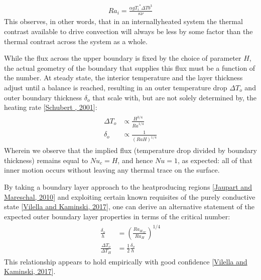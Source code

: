 \documentclass[letterpaper,10pt,english]{jupyterBook}
\begin{document}
\begin{equation*}
\begin{split} {Ra}_i = \frac{\alpha g {T_i}^{*} \Delta T b^3}{\kappa \nu} \end{split}
\end{equation*}
\sphinxAtStartPar
This observes, in other words, that \sphinxhyphen{} in an internally\sphinxhyphen{}heated system \sphinxhyphen{} the thermal contrast available to drive convection will always be less by some factor than the thermal contrast across the system as a whole.

\sphinxAtStartPar
While the flux across the upper boundary is fixed by the choice of parameter \(H\), the actual geometry of the boundary that supplies this flux must be a function of the  number. At steady state, the interior temperature and the layer thickness adjust until a balance is reached, resulting in an outer temperature drop \({\Delta T}_o\) and outer boundary thickness \({\delta}_o\) that scale with, but are not solely determined by, the heating rate {[}\hyperlink{cite.references:id663}{Schubert , 2001}{]}:
\begin{equation*}
\begin{split} \begin{align*}
{\Delta T}_o &\propto \frac{H^{3/4}}{{Ra}^{1/4}} \\
{\delta}_o &\propto \frac{1}{{(RaH)}^{1/4}}
\end{align*} \end{split}
\end{equation*}
\sphinxAtStartPar
Wherein we observe that the implied flux (temperature drop divided by boundary thickness) remains equal to \({Nu}_c = H\), and hence \(Nu=1\), as expected: all of that inner motion occurs without leaving any thermal trace on the surface.

\sphinxAtStartPar
By taking a boundary layer approach to the heat\sphinxhyphen{}producing regions {[}\hyperlink{cite.references:id649}{Jaupart and Mareschal, 2010}{]} and exploiting certain known requisites of the purely conductive state {[}\hyperlink{cite.references:id815}{Vilella and Kaminski, 2017}{]}, one can derive an alternative statement of the expected outer boundary layer properties in terms of the critical  number:
\begin{equation*}
\begin{split} \begin{align*}
\frac{{\delta}_o}{h} &= {\left( \frac{{{Ra}_{H}}_{cr}}{{Ra}_H} \right)}^{1/4} \\
\frac{{\Delta T}_o}{{\Delta T}_H} &= \frac{1}{2} \frac{{\delta}_o}{h}
\end{align*} \end{split}
\end{equation*}
\sphinxAtStartPar
This relationship appears to hold empirically with good confidence {[}\hyperlink{cite.references:id815}{Vilella and Kaminski, 2017}{]}.
\end{document}
